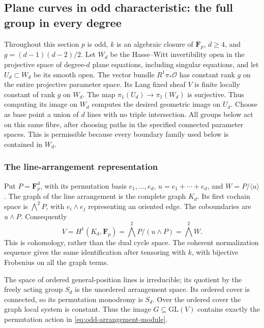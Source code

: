 \subsection{Plane curves in odd characteristic: the full group in every degree}
\label{sec:odd-plane-all-degrees}

Throughout this section $p$ is odd, $k$ is an algebraic closure of
$\mathbf F_p$, $d\geq4$, and $g=(d-1)(d-2)/2$.  Let $W_d$ be the
Hasse--Witt invertibility open in the projective space of degree-$d$
plane equations, including singular equations, and let $U_d\subset W_d$
be its smooth open.  The vector bundle $R^1\pi_*\mathcal O$ has constant
rank $g$ on the entire projective parameter space.  Its Lang fixed
sheaf $V$ is finite locally constant of rank $g$ on $W_d$.
The map $\pi_1(U_d)\to\pi_1(W_d)$ is surjective.  Thus computing its
image on $W_d$ computes the desired geometric image on $U_d$.
Choose as base point a union of $d$ lines with no triple intersection.
All groups below act on this same fibre, after choosing paths in the
specified connected parameter spaces.  This is permissible because
every boundary family used below is contained in $W_d$.

\subsubsection{The line-arrangement representation}

Put $P=\mathbf F_p^d$, with its permutation basis $e_1,\ldots,e_d$,
$u=e_1+\cdots+e_d$, and $W=P/\langle u\rangle$.  The graph of the
line arrangement is the complete graph $K_d$.  Its first cochain space
is $\bigwedge^2P$, with $e_i\wedge e_j$ representing an oriented edge.
The coboundaries are $u\wedge P$.  Consequently
\begin{equation}\label{eq:odd-arrangement-module}
 V=H^1(K_d,\mathbf F_p)
   =\bigwedge^2P/(u\wedge P)=\bigwedge^2W.
\end{equation}
This is cohomology, rather than the dual cycle space.  The coherent
normalization sequence gives the same identification after tensoring
with $k$, with bijective Frobenius on all the graph terms.

The space of ordered general-position lines is irreducible; its
quotient by the freely acting group $S_d$ is the unordered arrangement
space.  Its ordered cover is connected, so its permutation monodromy
is $S_d$.  Over the ordered cover the graph local system is constant.
Thus the image $G\subseteq\mathrm{GL}(V)$ contains exactly the
permutation action in \eqref{eq:odd-arrangement-module}.

